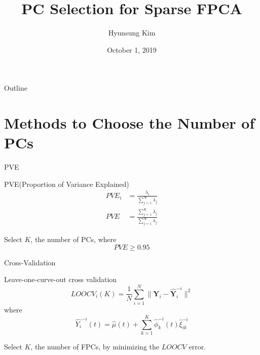 \documentclass{beamer}
\title{PC Selection for Sparse FPCA}
\date[Short Occasion]{October 1, 2019}
\author{Hyunsung Kim}
\institute{Department of Statistics\\ Chung-Ang University}
\subtitle{}
\def \bY {\mathbf{Y}}
\begin{document}
\begin{frame}
  \titlepage
\end{frame}

\begin{frame}{Outline}
  \tableofcontents
\end{frame}

\section{Methods to Choose the Number of PCs}
\begin{frame}{PVE}
	\begin{block}{PVE(Proportion of Variance Explained)}
		\vspace{0.2cm}
		$$ \begin{aligned}
			PVE_i &= \frac{\lambda_i}{\sum_{j=1}^{\infty}\lambda_j} \\
			PVE &= \frac{\sum_{j=1}^{K}\lambda_j}{\sum_{j=1}^{\infty}\lambda_j}
		\end{aligned}
		$$
		
		Select $K$, the number of PCs, where 
		$$ PVE \ge 0.95 $$
	\end{block}
\end{frame}

\begin{frame}{Cross-Validation}
	\begin{block}{Leave-one-curve-out cross validation}
		\vspace{0.1cm}
		$$ LOOCV_i(K) = \frac{1}{N} \sum_{i=1}^N \lVert \bY_i - \widehat{\bY}_i^{-i} \lVert^2  $$
		where
		$$ \widehat{Y_i}^{-i}(t) = \hat\mu(t) + \sum_{k=1}^K \hat\phi_k^{-i}(t) \hat\xi_{ik}^{-i} $$
		
		Select $K$, the number of FPCs, by minimizing the $LOOCV$ error.
	\end{block}
\end{frame}
\end{document}
